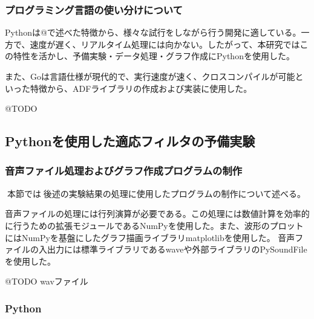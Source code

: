 \hypertarget{ux30d7ux30edux30b0ux30e9ux30dfux30f3ux30b0ux8a00ux8a9eux306eux4f7fux3044ux5206ux3051ux306bux3064ux3044ux3066}{%
\subsubsection{プログラミング言語の使い分けについて}\label{ux30d7ux30edux30b0ux30e9ux30dfux30f3ux30b0ux8a00ux8a9eux306eux4f7fux3044ux5206ux3051ux306bux3064ux3044ux3066}}

Pythonは@で述べた特徴から、様々な試行をしながら行う開発に適している。一方で、速度が遅く、リアルタイム処理には向かない。したがって、本研究ではこの特性を活かし、予備実験・データ処理・グラフ作成にPythonを使用した。

また、Goは言語仕様が現代的で、実行速度が速く、クロスコンパイルが可能といった特徴から、ADFライブラリの作成および実装に使用した。

@TODO

\hypertarget{pythonux3092ux4f7fux7528ux3057ux305fux9069ux5fdcux30d5ux30a3ux30ebux30bfux306eux4e88ux5099ux5b9fux9a13}{%
\subsection{Pythonを使用した適応フィルタの予備実験}\label{pythonux3092ux4f7fux7528ux3057ux305fux9069ux5fdcux30d5ux30a3ux30ebux30bfux306eux4e88ux5099ux5b9fux9a13}}

\hypertarget{ux97f3ux58f0ux30d5ux30a1ux30a4ux30ebux51e6ux7406ux304aux3088ux3073ux30b0ux30e9ux30d5ux4f5cux6210ux30d7ux30edux30b0ux30e9ux30e0ux306eux5236ux4f5c}{%
\subsubsection{音声ファイル処理およびグラフ作成プログラムの制作}\label{ux97f3ux58f0ux30d5ux30a1ux30a4ux30ebux51e6ux7406ux304aux3088ux3073ux30b0ux30e9ux30d5ux4f5cux6210ux30d7ux30edux30b0ux30e9ux30e0ux306eux5236ux4f5c}}

本節では後述の実験結果の処理に使用したプログラムの制作について述べる。

音声ファイルの処理には行列演算が必要である。この処理には数値計算を効率的に行うための拡張モジュールであるNumPyを使用した。また、波形のプロットにはNumPyを基盤にしたグラフ描画ライブラリmatplotlibを使用した。
音声ファイルの入出力には標準ライブラリであるwaveや外部ライブラリのPySoundFileを使用した。

@TODO wavファイル

\hypertarget{python}{%
\subsubsection{Python}\label{python}}


